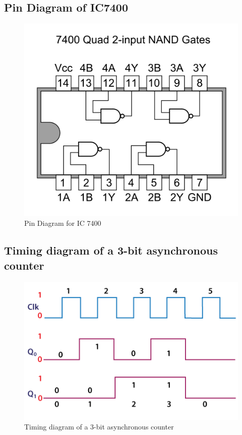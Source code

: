 \documentclass[11pt]{article}
\begin{document}
\subsection{Pin Diagram of IC7400}
\begin{figure}[H]
	\centering
	\includegraphics[scale = 0.25]{7400.png}
	\caption{Pin Diagram for IC 7400}
\end{figure}
\subsection{Timing diagram of a 3-bit asynchronous counter}
\begin{figure}[H]
	\centering
	\includegraphics[scale = 0.55]{counters4.png}
	\caption{Timing diagram of a 3-bit asynchronous counter}
\end{figure}
\end{document}
